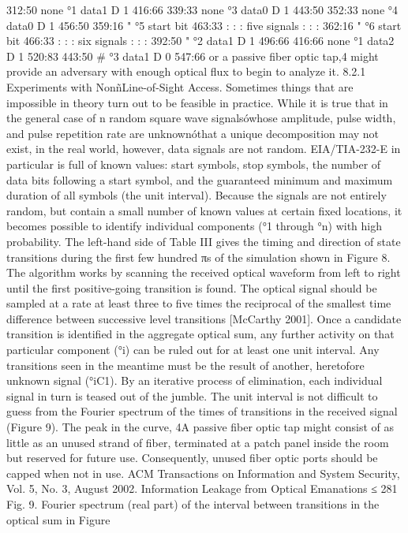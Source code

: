 312:50 none °1 data1 D 1 416:66 
339:33 none °3 data0 D 1 443:50 
352:33 none °4 data0 D 1 456:50 
359:16 " °5 start bit 463:33 : : : five signals : : : 
362:16 " °6 start bit 466:33 : : : six signals : : : 
392:50 " °2 data1 D 1 496:66 
416:66 none °1 data2 D 1 520:83 
443:50 # °3 data1 D 0 547:66 
or a passive fiber optic tap,4 might provide an adversary with enough optical 
flux to begin to analyze it. 
8.2.1 Experiments with NonñLine-of-Sight Access. Sometimes things that 
are impossible in theory turn out to be feasible in practice. While it is true 
that in the general case of n random square wave signalsówhose amplitude, 
pulse width, and pulse repetition rate are unknownóthat a unique decomposition 
may not exist, in the real world, however, data signals are not random. 
EIA/TIA-232-E in particular is full of known values: start symbols, stop symbols, 
the number of data bits following a start symbol, and the guaranteed 
minimum and maximum duration of all symbols (the unit interval). Because 
the signals are not entirely random, but contain a small number of known 
values at certain fixed locations, it becomes possible to identify individual components 
(°1 through °n) with high probability. The left-hand side of Table III 
gives the timing and direction of state transitions during the first few hundred 
πs of the simulation shown in Figure 8. The algorithm works by scanning the 
received optical waveform from left to right until the first positive-going transition 
is found. The optical signal should be sampled at a rate at least three 
to five times the reciprocal of the smallest time difference between successive 
level transitions [McCarthy 2001]. Once a candidate transition is identified in 
the aggregate optical sum, any further activity on that particular component 
(°i) can be ruled out for at least one unit interval. Any transitions seen in the 
meantime must be the result of another, heretofore unknown signal (°iC1). By 
an iterative process of elimination, each individual signal in turn is teased out 
of the jumble. 
The unit interval is not difficult to guess from the Fourier spectrum of the 
times of transitions in the received signal (Figure 9). The peak in the curve, 
4A passive fiber optic tap might consist of as little as an unused strand of fiber, terminated at a 
patch panel inside the room but reserved for future use. Consequently, unused fiber optic ports 
should be capped when not in use. 
ACM Transactions on Information and System Security, Vol. 5, No. 3, August 2002.
Information Leakage from Optical Emanations ≤ 281 
Fig. 9. Fourier spectrum (real part) of the interval between transitions in the optical sum in Figure 
